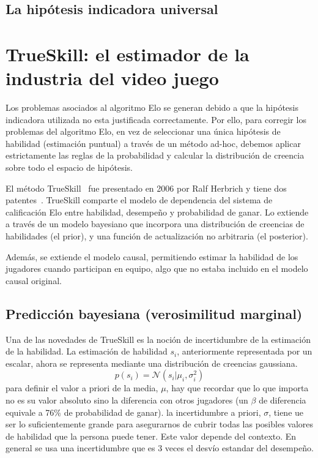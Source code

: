 \documentclass[a4paper,11pt]{book}
\newcommand{\N}{\mathcal{N}}
\theoremstyle{definition}
\begin{document}
\subsection{La hipótesis indicadora universal} \label{sec:trueskill}

\section{TrueSkill: el estimador de la industria del video juego}

Los problemas asociados al algoritmo Elo se generan debido a que la hip\'otesis indicadora utilizada no esta justificada correctamente.
%
%
Por ello, para corregir los problemas del algoritmo Elo, en vez de seleccionar una \'unica hip\'otesis de habilidad (estimaci\'on puntual) a través de un método ad-hoc, debemos aplicar estrictamente las reglas de la probabilidad y calcular la distribuci\'on de creencia sobre todo el espacio de hip\'otesis.


El método TrueSkill~\cite{herbrich2006-trueskill} fue presentado en 2006 por Ralf Herbrich y tiene dos patentes~\cite{trueskill_patent_06, trueskill_patent_09}.
%
TrueSkill comparte el modelo de dependencia del sistema de calificación Elo entre habilidad, desempeño y probabilidad de ganar.
%
Lo extiende a través de un modelo bayesiano que incorpora una distribución de creencias de habilidades (el prior), y una función de actualización no arbitraria (el posterior).



Además, se extiende el modelo causal, permitiendo estimar la habilidad de los jugadores cuando participan en equipo, algo que no estaba incluido en el modelo causal original.


\subsection{Predicción bayesiana (verosimilitud marginal)}

Una de las novedades de TrueSkill es la noción de incertidumbre de la estimación de la habilidad.
%
La estimación de habilidad $s_i$, anteriormente representada por un escalar, ahora se representa mediante una distribución de creencias gaussiana.
%
\begin{equation}
p(s_i) = \N(s_i | \mu_i, \sigma_i^2)
\end{equation}
%
para definir el valor a priori de la media, $\mu$, hay que recordar que lo que importa no es su valor absoluto sino la diferencia con otros jugadores (un $\beta$ de diferencia equivale a 76\% de probabilidad de ganar).
%
la incertidumbre a priori, $\sigma$, tiene ue ser lo suficientemente grande para asegurarnos de cubrir todas las posibles valores de habilidad que la persona puede tener.
%
Este valor depende del contexto.
%
En general se usa una incertidumbre que es 3 veces el desvío estandar del desempeño.
\end{document}

